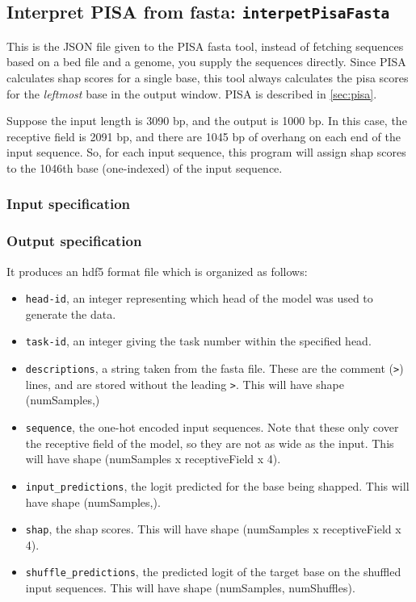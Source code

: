 \documentclass{article}
\begin{document}
\subsection{Interpret PISA from fasta: \texttt{interpetPisaFasta}}\label{prog:interpretPisaFasta}

This is the JSON file given to the PISA fasta tool, instead of fetching
sequences based on a bed file and a genome, you supply the sequences directly.
Since PISA calculates shap scores for a single base, this tool always calculates
the pisa scores for the \emph{leftmost} base in the output window.
PISA is described in \ref{sec:pisa}.

Suppose the input length is 3090 bp, and the output is 1000 bp.
In this case, the receptive field is 2091 bp, and there are 1045 bp of overhang
on each end of the input sequence.
So, for each input sequence, this program will assign shap scores to the 1046th
base (one-indexed) of the input sequence.

\subsubsection{Input specification}


\subsubsection{Output specification}

It produces an hdf5 format file which is organized as follows:

\begin{itemize}
    \item \texttt{head-id}, an integer representing which head of the model was
        used to generate the data.
    \item \texttt{task-id}, an integer giving the task number within the
        specified head.
    \item \texttt{descriptions}, a string taken from the fasta file.
        These are the comment (\texttt{>}) lines, and are stored without the
        leading \texttt{>}.
        This will have shape (numSamples,)
    \item \texttt{sequence}, the one-hot encoded input sequences.
        Note that these only cover the receptive field of the model, so they are
        not as wide as the input.
        This will have shape (numSamples x receptiveField x 4).
    \item \texttt{input\_predictions}, the logit predicted for the base being
        shapped.
        This will have shape (numSamples,).
    \item \texttt{shap}, the shap scores.
        This will have shape (numSamples x receptiveField x 4).
    \item \texttt{shuffle\_predictions}, the predicted logit of the target base
        on the shuffled input sequences.
        This will have shape (numSamples, numShuffles).
\end{itemize}
\end{document}
